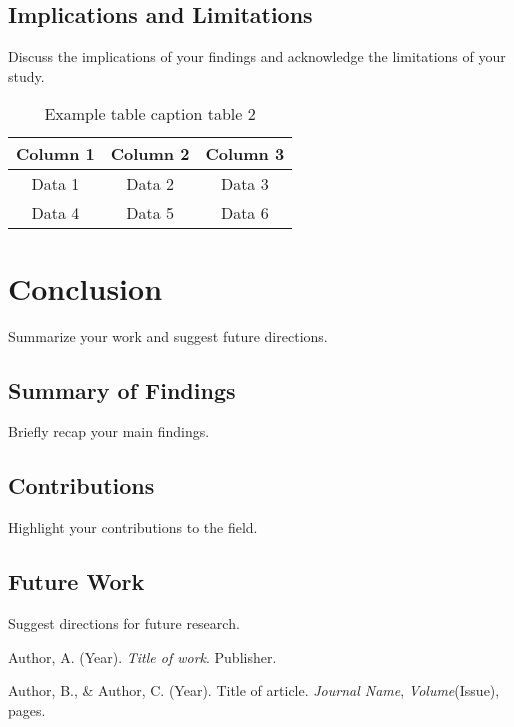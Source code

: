 \section{Implications and Limitations}

Discuss the implications of your findings and acknowledge the limitations of your study. 
\begin{table}[ht]
    \centering
    \begin{tabular}{|c|c|c|}
        \hline
        Column 1 & Column 2 & Column 3 \\
        \hline
        Data 1 & Data 2 & Data 3 \\
        Data 4 & Data 5 & Data 6 \\
        \hline
    \end{tabular}
    \caption{Example table caption table 2}
    \label{tab:example2}
\end{table}

\chapter{Conclusion}

Summarize your work and suggest future directions.

\section{Summary of Findings}

Briefly recap your main findings.

\section{Contributions}

Highlight your contributions to the field.

\section{Future Work}

Suggest directions for future research.

\begin{thebibliography}{99}
    
    Author, A. (Year). \textit{Title of work}. Publisher.
    
    Author, B., \& Author, C. (Year). Title of article. \textit{Journal Name}, \textit{Volume}(Issue), pages.
    
    
\end{thebibliography}

